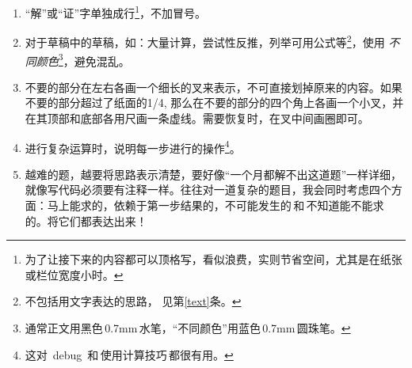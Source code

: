 \documentclass[11pt, a4paper]{article}
\begin{document}
\begin{enumerate}
\item “解”或“证”字单独成行\footnote{为了让接下来的内容都可以顶格写，看似浪费，实则节省空间，尤其是在纸张或栏位宽度小时。}，不加冒号。
\item 对于草稿中的草稿，如：大量计算，尝试性反推，列举可用公式等\footnote{不包括用文字表达的思路，
    见第\ref{text}条。}，使用{\color{blue} \emph{不同颜色}}\footnote{通常正文用黑色\,0.7mm\,水笔，“不同颜色”用蓝色\,0.7mm\,圆珠笔。}，避免混乱。
\item 不要的部分在左右各画一个细长的叉来表示，不可直接划掉原来的内容。如果不要的部分超过了纸面的1/4, 那么在不要的部分的四个角上各画一个小叉，并在其顶部和底部各用尺画一条虚线。需要恢复时，在叉中间画圈即可。
\item 进行复杂运算时，说明每一步进行的操作\footnote{这对\ debug\ 和\,使用计算技巧\,都很有用。}。
\item \label{text}越难的题，越要将思路表示清楚，要好像“一个月都解不出这道题”一样详细，就像写代码必须要有注释一样。往往对一道复杂的题目，我会同时考虑四个方面：马上能求的，依赖于第一步结果的，不可能发生的\,和\,不知道能不能求的。将它们都表达出来！
\end{enumerate}
\end{document}
